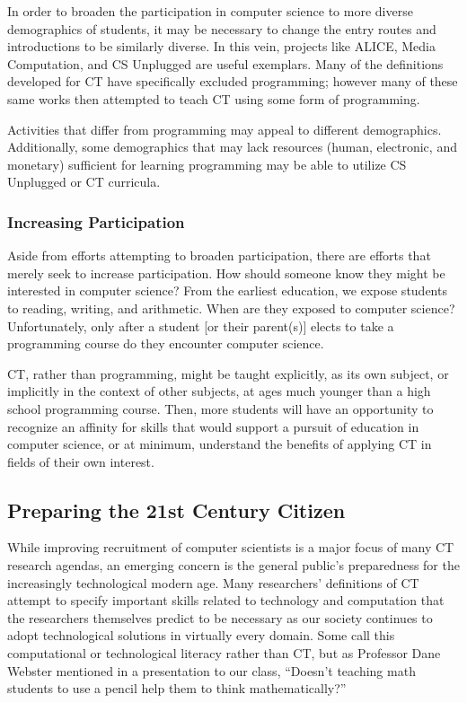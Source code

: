 \documentclass{acm_proc_article-sp}
\begin{document}
In order to broaden the participation in computer science to more diverse demographics of students, it may be necessary to change the entry routes and introductions to be similarly diverse. In this vein, projects like ALICE\cite{pausch1995alice}, Media Computation\cite{guzdial2003media}, and CS Unplugged\cite{csunplugged} are useful exemplars. Many of the definitions developed for CT have specifically excluded programming; however many of these same works then attempted to teach CT using some form of programming.

Activities that differ from programming may appeal to different demographics. Additionally, some demographics that may lack resources (human, electronic, and monetary) sufficient for learning programming may be able to utilize CS Unplugged or CT curricula.

\subsubsection{Increasing Participation}
Aside from efforts attempting to broaden participation, there are efforts that merely seek to increase participation. How should someone know they might be interested in computer science? From the earliest education, we expose students to reading, writing, and arithmetic. When are they exposed to computer science? Unfortunately, only after a student [or their parent(s)] elects to take a programming course do they encounter computer science. 

CT, rather than programming, might be taught explicitly, as its own subject, or implicitly in the context of other subjects, at ages much younger than a high school programming course. Then, more students will have an opportunity to recognize an affinity for skills that would support a pursuit of education in computer science, or at minimum, understand the benefits of applying CT in fields of their own interest.

\subsection{Preparing the 21st Century Citizen}
While improving recruitment of computer scientists is a major focus of many CT research agendas, an emerging concern is the general public's preparedness for the increasingly technological modern age. Many researchers' definitions of CT attempt to specify important skills related to technology and computation that the researchers themselves predict to be necessary as our society continues to adopt technological solutions in virtually every domain. Some call this computational or technological literacy rather than CT, but as Professor Dane Webster mentioned in a presentation to our class, ``Doesn{'}t teaching math students to use a pencil help them to think mathematically?''
\end{document}
